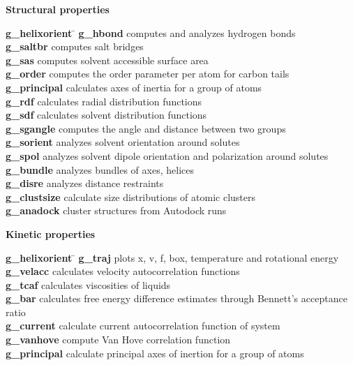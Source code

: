 \begin{description}
\item {\large\bf Structural properties}
\vspace{-2ex}\begin{tabbing}
{\bf g\_helixorient} \= \kill
{\bf g\_hbond} \> computes and analyzes hydrogen bonds \\
{\bf g\_saltbr} \> computes salt bridges \\
{\bf g\_sas} \> computes solvent accessible surface area \\
{\bf g\_order} \> computes the order parameter per atom for carbon tails \\
{\bf g\_principal} \> calculates axes of inertia for a group of atoms \\
{\bf g\_rdf} \> calculates radial distribution functions \\
{\bf g\_sdf} \> calculates solvent distribution functions \\
{\bf g\_sgangle} \> computes the angle and distance between two groups \\
{\bf g\_sorient} \> analyzes solvent orientation around solutes \\
{\bf g\_spol} \> analyzes solvent dipole orientation and polarization around solutes \\
{\bf g\_bundle} \> analyzes bundles of axes, {\eg} helices \\
{\bf g\_disre} \> analyzes distance restraints \\
{\bf g\_clustsize} \> calculate size distributions of atomic clusters \\
{\bf g\_anadock} \> cluster structures from Autodock runs \\
\end{tabbing}\vspace{-2ex}

\item {\large\bf Kinetic properties}
\vspace{-2ex}\begin{tabbing}
{\bf g\_helixorient} \= \kill
{\bf g\_traj} \> plots x, v, f, box, temperature and rotational energy \\
{\bf g\_velacc} \> calculates velocity autocorrelation functions \\
{\bf g\_tcaf} \> calculates viscosities of liquids \\
{\bf g\_bar} \> calculates free energy difference estimates through Bennett's acceptance ratio \\
{\bf g\_current} \> calculate current autocorrelation function of system \\
{\bf g\_vanhove} \> compute Van Hove correlation function \\
{\bf g\_principal} \> calculate principal axes of inertion for a group of atoms \\
\end{tabbing}\vspace{-2ex}


\end{description}
